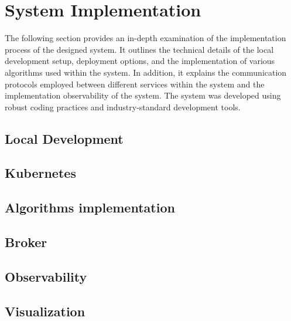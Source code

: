 \chapter{System Implementation}
The following section provides an in-depth examination of the implementation process of the designed system. It outlines the technical details of the local development setup, deployment options, and the implementation of various algorithms used within the system. In addition, it explains the communication protocols employed between different services within the system and the implementation observability of the system. The system was developed using robust coding practices and industry-standard development tools. 

\section{Local Development}


\section{Kubernetes}


\section{Algorithms implementation}


\section{Broker}


\section{Observability}
\label{sec:04_06_observability}


% 

\section{Visualization}

